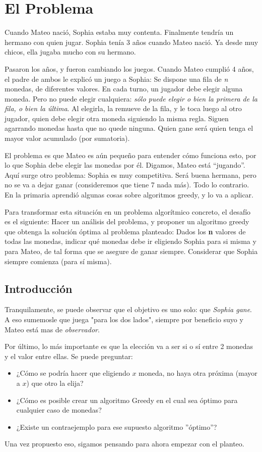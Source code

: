 \section{El Problema}

Cuando Mateo nació, Sophia estaba muy contenta. Finalmente tendría un hermano con quien jugar. Sophia tenía 3 años cuando Mateo nació. Ya desde muy chicos, ella jugaba mucho con su hermano.

Pasaron los años, y fueron cambiando los juegos. Cuando Mateo cumplió 4 años, el padre de ambos le explicó un juego a Sophia: Se dispone una fila de \textit{n} monedas, de diferentes valores. En cada turno, un jugador debe elegir alguna moneda. Pero no puede elegir cualquiera: \textit{sólo puede elegir o bien la primera de la fila, o bien la última}. Al elegirla, la remueve de la fila, y le toca luego al otro jugador, quien debe elegir otra moneda siguiendo la misma regla. Siguen agarrando monedas hasta que no quede ninguna. Quien gane será quien tenga el mayor valor acumulado (por sumatoria).

El problema es que Mateo es aún pequeño para entender cómo funciona esto, por lo que Sophia debe elegir las monedas por él. Digamos, Mateo está “jugando”. Aquí surge otro problema: Sophia es muy competitiva. Será buena hermana, pero no se va a dejar ganar (consideremos que tiene 7 nada más). Todo lo contrario. En la primaria aprendió algunas cosas sobre algoritmos greedy, y lo va a aplicar.

Para transformar esta situación en un problema algorítmico concreto, el desafío es el siguiente:
Hacer un análisis del problema, y proponer un algoritmo greedy que obtenga la solución óptima al problema planteado: Dados los \textbf{n} valores de todas las monedas, indicar qué monedas debe ir eligiendo Sophia para si misma y para Mateo, de tal forma que se asegure de ganar siempre. Considerar que Sophia siempre comienza (para sí misma).

\subsection{Introducción}

Tranquilamente, se puede observar que el objetivo es uno solo: que \textit{Sophia gane}. A eso sumemosle que juega "para los dos lados", siempre por beneficio suyo y Mateo está mas de \textit{observador}.

\vspace{0.425cm}
Por último, lo más importante es que la elección va a ser si o sí entre 2 monedas y el valor entre ellas. Se puede preguntar:
\begin{itemize}
    \item ¿Cómo se podría hacer que eligiendo $x$ moneda, no haya otra próxima (mayor a $x$) que otro la elija? 
    \item ¿Cómo es posible crear un algoritmo Greedy en el cual sea óptimo para cualquier caso de monedas? 
    \item ¿Existe un contraejemplo para ese supuesto algoritmo ''óptimo''?
\end{itemize}
Una vez propuesto eso, sigamos pensando para ahora empezar con el planteo.

